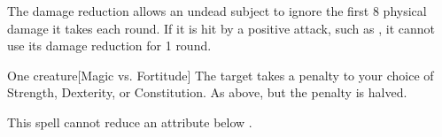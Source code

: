 The damage reduction allows an undead subject to ignore the first 8 physical damage it takes each round. If it is hit by a positive attack, such as , it cannot use its damage reduction for 1 round.

\spellrng{\rngmed}
\spelldur{\durshort}
\begin{spelltarget}{One creature}[Magic vs. Fortitude]
    \spellsuccess The target takes a  penalty to your choice of Strength, Dexterity, or Constitution.
    \spellfailure As above, but the penalty is halved.
\end{spelltarget}
\spellnotes This spell cannot reduce an attribute below .

